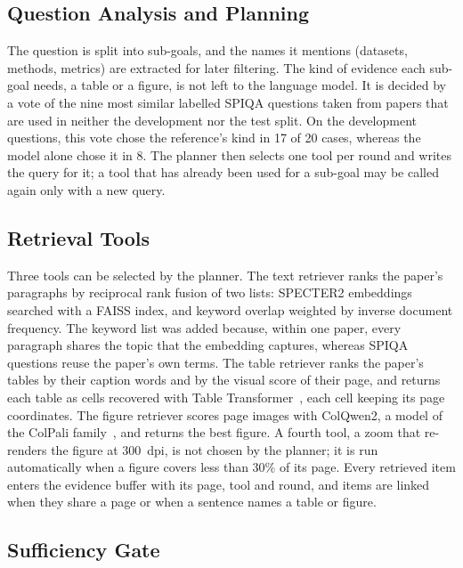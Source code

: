 \subsection{Question Analysis and Planning}

The question is split into sub-goals, and the names it mentions (datasets, methods,
metrics) are extracted for later filtering. The kind of evidence each sub-goal needs,
a table or a figure, is not left to the language model. It is decided by a vote of the
nine most similar labelled SPIQA questions taken from papers that are used in neither
the development nor the test split. On the development questions, this vote chose the
reference's kind in 17 of 20 cases, whereas the model alone chose it in 8. The planner
then selects one tool per round and writes the query for it; a tool that has already
been used for a sub-goal may be called again only with a new query.

\subsection{Retrieval Tools}

Three tools can be selected by the planner. The text retriever ranks the paper's
paragraphs by reciprocal rank fusion of two lists: SPECTER2
embeddings~\cite{singh2023scirepeval} searched with a FAISS index, and
keyword overlap weighted by inverse document frequency. The keyword list was added
because, within one paper, every paragraph shares the topic that the embedding
captures, whereas SPIQA questions reuse the paper's own terms. The table retriever
ranks the paper's tables by their caption words and by the visual score of their page,
and returns each table as cells recovered with Table Transformer~\cite{smock2022pubtables},
each cell keeping its page coordinates. The figure retriever scores page images with
ColQwen2, a model of the ColPali family~\cite{faysse2025colpali}, and returns the best
figure. A fourth tool, a zoom that re-renders the figure at 300~dpi, is not chosen by
the planner; it is run automatically when a figure covers less than 30\% of its page.
Every retrieved item enters the evidence buffer with its page, tool and round, and
items are linked when they share a page or when a sentence names a table or figure.

\subsection{Sufficiency Gate}

